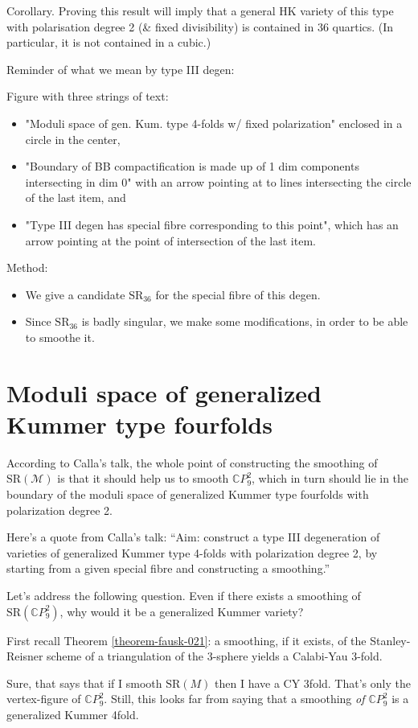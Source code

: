 Corollary. Proving this result will imply that a 
general HK variety of this type with polarisation
degree 2 (\& fixed divisibility) is contained
in 36 quartics.
(In particular, it is not contained in a cubic.)

\medskip\noindent
Reminder of what we mean by type III degen:

Figure with three strings of text:
\begin{itemize}
\item "Moduli space of gen. Kum. type
4-folds w/ fixed polarization" enclosed in a circle
in the center,
\item "Boundary of BB compactification
is made up of 1 dim components 
intersecting in dim 0" with an arrow
pointing at to lines intersecting the circle
of the last item, and
\item "Type III degen has special fibre corresponding
to this point", which has an arrow pointing
at the point of intersection of the last item.
\end{itemize}

\medskip\noindent
Method: 
\begin{itemize}
\item We give a candidate $\text{SR}_{36}$ for
the special fibre of this degen.
\item Since $\text{SR}_{36}$ is badly singular,
we make some modifications,
in order to be able to smoothe it.

\end{itemize}
\section{Moduli space of generalized Kummer type fourfolds}
\label{section-moduli-kummer}

\noindent
According to Calla's talk,
the whole point of constructing the smoothing
of $\text{SR}(\mathcal{M})$ is that it
should help us to smooth $\mathbb{C}P^2_9$,
which in turn should lie in the boundary
of the moduli space of generalized Kummer type fourfolds
with polarization degree 2.

Here's a quote from Calla's talk:
``Aim: construct a type III
degeneration of varieties of generalized
Kummer type 4-folds with polarization degree 2,
by starting from a given special fibre
and constructing a smoothing.''

\medskip\noindent
Let's address the following question.
Even if there exists a smoothing of $\text{SR}(\mathbb{C}P^2_9)$,
why would it be a generalized Kummer variety?

First recall Theorem \ref{theorem-fausk-021}:
a smoothing, if it exists, of the
Stanley-Reisner scheme of a triangulation of
the 3-sphere yields a Calabi-Yau 3-fold.

\noindent
Sure, that says that if I smooth $\text{SR}(M)$ 
then I have a CY 3fold. That's only the vertex-figure
of $\mathbb{C}P^2_9$.
Still, this looks far from saying that a smoothing
{\it of $\mathbb{C}P^2_9$} is a generalized Kummer 4fold.






